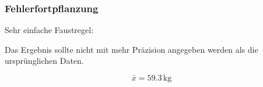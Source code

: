 \documentclass{beamer}
\begin{document}
\begin{frame}
\end{frame}

\begin{frame}
\end{frame}


\begin{frame}
\frametitle{Fehlerfortpflanzung}

Sehr einfache Faustregel:

Das Ergebnis sollte nicht mit mehr Präzision angegeben werden als die ursprünglichen Daten. 

\pause

\[
\bar{x} = 59.3\,\text{kg}
\]

\end{frame}
\end{document}
